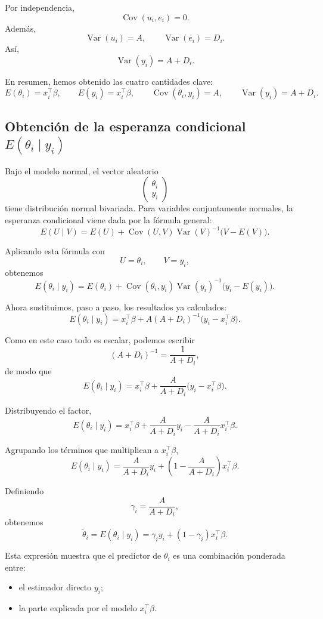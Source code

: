 Por independencia,
\[
\operatorname{Cov}(u_i,e_i)=0.
\]
Además,
\[
\operatorname{Var}(u_i)=A, \qquad \operatorname{Var}(e_i)=D_i.
\]
Así,
\[
\operatorname{Var}(y_i)=A+D_i.
\]

En resumen, hemos obtenido las cuatro cantidades clave:
\[
E(\theta_i)=x_i^{\top}\beta,
\qquad
E(y_i)=x_i^{\top}\beta,
\qquad
\operatorname{Cov}(\theta_i,y_i)=A,
\qquad
\operatorname{Var}(y_i)=A+D_i.
\]

\subsection{Obtención de la esperanza condicional \(E(\theta_i\mid y_i)\)}

Bajo el modelo normal, el vector aleatorio
\[
\begin{pmatrix}
\theta_i\\
y_i
\end{pmatrix}
\]
tiene distribución normal bivariada. Para variables conjuntamente normales, la esperanza condicional viene dada por la fórmula general:
\[
E(U\mid V)
=
E(U)+\operatorname{Cov}(U,V)\operatorname{Var}(V)^{-1}\bigl(V-E(V)\bigr).
\]

Aplicando esta fórmula con
\[
U=\theta_i,
\qquad
V=y_i,
\]
obtenemos
\[
E(\theta_i\mid y_i)
=
E(\theta_i)
+
\operatorname{Cov}(\theta_i,y_i)\operatorname{Var}(y_i)^{-1}\bigl(y_i-E(y_i)\bigr).
\]

Ahora sustituimos, paso a paso, los resultados ya calculados:
\[
E(\theta_i\mid y_i)
=
x_i^{\top}\beta
+
A(A+D_i)^{-1}\bigl(y_i-x_i^{\top}\beta\bigr).
\]

Como en este caso todo es escalar, podemos escribir
\[
(A+D_i)^{-1}=\frac{1}{A+D_i},
\]
de modo que
\[
E(\theta_i\mid y_i)
=
x_i^{\top}\beta
+
\frac{A}{A+D_i}\bigl(y_i-x_i^{\top}\beta\bigr).
\]

Distribuyendo el factor,
\[
E(\theta_i\mid y_i)
=
x_i^{\top}\beta
+
\frac{A}{A+D_i}y_i
-
\frac{A}{A+D_i}x_i^{\top}\beta.
\]

Agrupando los términos que multiplican a $x_i^{\top}\beta$,
\[
E(\theta_i\mid y_i)
=
\frac{A}{A+D_i}y_i
+
\left(1-\frac{A}{A+D_i}\right)x_i^{\top}\beta.
\]

Definiendo
\[
\gamma_i=\frac{A}{A+D_i},
\]
obtenemos
\[
\tilde{\theta}_i
=
E(\theta_i\mid y_i)
=
\gamma_i y_i + (1-\gamma_i)x_i^{\top}\beta.
\]

Esta expresión muestra que el predictor de $\theta_i$ es una combinación ponderada entre:
\begin{itemize}
    \item el estimador directo $y_i$;
    \item la parte explicada por el modelo $x_i^{\top}\beta$.
\end{itemize}


